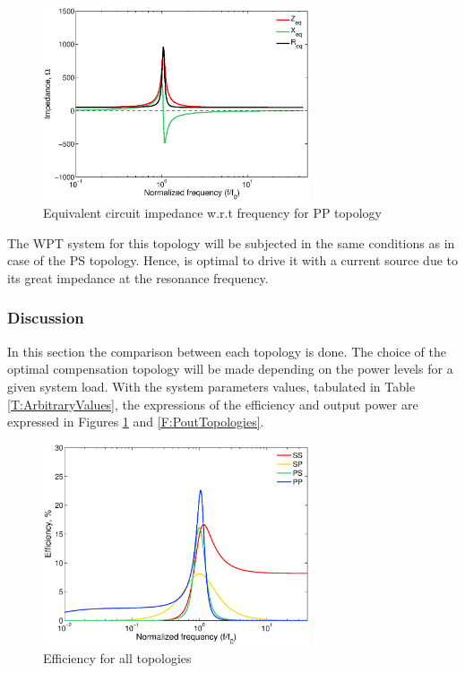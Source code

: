 \begin{figure}[h!]
\begin{center}
\includegraphics[width=0.7\textwidth]{./images/PP_impedance} 
\caption{Equivalent circuit impedance w.r.t frequency for PP topology}
\end{center}
\end{figure}


The WPT system for this topology will be subjected in the same conditions as in case of the PS topology. Hence, is optimal to drive it with a current source due to its great impedance at the resonance frequency.

\subsubsection{Discussion}\label{subsec:discussion2}

In this section the comparison between each topology is done. The choice of the optimal compensation topology will be made depending on the power levels for a given system load. With the system parameters values, tabulated in Table \ref{T:ArbitraryValues}, the expressions of the efficiency and output power are expressed in Figures \ref{F:effTopologies} and \ref{F:PoutTopologies}. 


\begin{figure}[h!]
\begin{center}
\includegraphics[width=0.7\textwidth]{./images/effModel} 
\caption{Efficiency for all topologies}
\label{F:effTopologies}
\end{center}
\end{figure}


